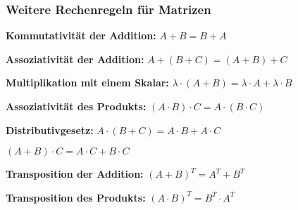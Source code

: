 \documentclass{beamer}
\begin{document}
\begin{frame}
  \frametitle{Weitere Rechenregeln für Matrizen}
  
  \textbf{Kommutativität der Addition:}
  $A + B = B + A$
  
  \vspace{0.3cm}
  
  \textbf{Assoziativität der Addition:}
  $A + (B + C) = (A + B) + C$
  
  \vspace{0.3cm}
  
  \textbf{Multiplikation mit einem Skalar:}
  $\lambda \cdot (A + B) = \lambda \cdot A + \lambda \cdot B$
  
  \vspace{0.3cm}
  
  \textbf{Assoziativität des Produkts:}
  $(A \cdot B) \cdot C = A \cdot (B \cdot C)$
  
  \vspace{0.3cm}
  
  \textbf{Distributivgesetz:}
  $A \cdot (B + C) = A \cdot B + A \cdot C$
  
  $(A + B) \cdot C = A \cdot C + B \cdot C$
  
  \vspace{0.3cm}
  
  \textbf{Transposition der Addition:}
  $(A + B)^T = A^T + B^T$
  
  \vspace{0.3cm}
  
  \textbf{Transposition des Produkts:}
  $(A \cdot B)^T = B^T \cdot A^T$
  \end{frame}
\end{document}
